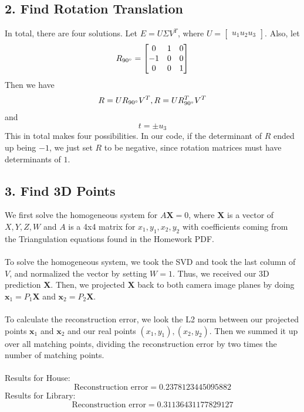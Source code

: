 \documentclass{article}\usepackage{amsmath,amssymb,amsthm,tikz,tkz-graph,color,chngpage,soul,hyperref,csquotes,graphicx,floatrow}\newcommand*{\QEDB}{\hfill\ensuremath{\square}}\newtheorem*{prop}{Proposition}\renewcommand{\theenumi}{\alph{enumi}}\usepackage[shortlabels]{enumitem}\usepackage[nobreak=true]{mdframed}\usetikzlibrary{matrix,calc}\MakeOuterQuote{"}\usepackage[margin=0.95in]{geometry} \newtheorem{theorem}{Theorem}
\begin{document}
\newpage
\subsection*{2. Find Rotation Translation}
\begin{mdframed}
In total, there are four solutions. Let $ E = U \Sigma V^T$, where $ U =\begin{bmatrix} u_1 u_2 u_3 \end{bmatrix} $. Also, let 
\[ R_{90\degree} =  
\begin{bmatrix}
 0 & 1 & 0 \\
 -1 & 0 & 0 \\
 0 & 0 & 1 \\
\end{bmatrix}
\]
Then we have \[ R = UR_{90\degree}V^T, R = UR_{90\degree}^T V^T \] and \[ t = \pm u_3 \] This in total makes four possibilities. In our code, if the determinant of $ R $ ended up being $ -1 $, we just set $ R $ to be negative, since rotation matrices must have determinants of $1$. 

\end{mdframed}

\subsection*{3. Find 3D Points}
\begin{mdframed}
We first solve the homogeneous system for $ A\textbf{X} =0$, where $ \textbf{X} $ is a vector of $X, Y, Z, W$ and $ A $ is a 4x4 matrix for $ x_1, y_1, x_2, y_2 $ with coefficients coming from the Triangulation equations found in the Homework PDF. \\\\ To solve the homogeneous system, we took the SVD and took the last column of $ V $, and normalized the vector by setting $ W =1$. Thus, we received our 3D prediction $ \textbf{X} $. Then, we projected $ \textbf{X} $ back to both camera image planes by doing $ \textbf{x}_1 = P_1 \textbf{X} $ and $  \textbf{x}_2 = P_2 \textbf{X} $.\\\\ To calculate the reconstruction error, we look the L2 norm between our projected points $ \textbf{x}_1 $ and $ \textbf{x}_2 $ and our real points  $ (x_1, y_1), (x_2, y_2) $. Then we summed it up over all matching points, dividing the reconstruction error by two times the number of matching points.\\\\Results for House:
\[ \text{Reconstruction error} = 0.2378123445095882 \] Results for Library:
\[ \text{Reconstruction error} = 0.31136431177829127\]
\end{mdframed}
\end{document}
